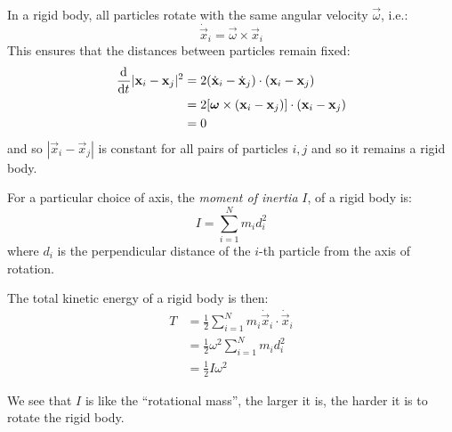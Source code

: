 \documentclass[../main.tex]{subfiles}
\begin{document}
In a rigid body, all particles rotate with the same angular velocity $\vec{\omega}$, i.e.:
\[
  \dot{\vec{x}}_i = \vec{\omega} \times \vec{x}_i
\]
This ensures that the distances between particles remain fixed:
\begin{align*}
  \deriv{}{t}|\vec{x}_i - \vec{x}_j|^2 &= 2(\dot{\vec{x}}_i - \dot{\vec{x}}_j) \cdot (\vec{x}_i - \vec{x}_j) \\
                                       &= 2 [\vec{\omega} \times (\vec{x}_i - \vec{x}_j)] \cdot (\vec{x}_i - \vec{x}_j) \\
                                       &= 0
\end{align*}
and so $|\vec{x}_i - \vec{x}_j|$ is constant for all pairs of particles $i, j$ and so it remains a rigid body.
\begin{definition}
  For a particular choice of axis, the \textit{moment of inertia} $I$, of a rigid body is:
  \[
    I = \sum_{i = 1}^{N} m_i d^2_i
  \]
  where $d_i$ is the perpendicular distance of the $i$-th particle from the axis of rotation.
\end{definition}
The total kinetic energy of a rigid body is then:
\begin{align}
  T &= \frac{1}{2} \sum_{i = 1}^{N} m_i \dot{\vec{x}}_i \cdot \dot{\vec{x}}_i \nonumber \\
    &= \frac{1}{2} \omega^2 \sum_{i = 1}^{N} m_i d^2_i \nonumber \\
    &= \frac{1}{2} I \omega^2 \label{totalRotationalKE}
\end{align}
\begin{remark}
  We see that $I$ is like the ``rotational mass'', the larger it is, the harder it is to rotate the rigid body.
\end{remark}
\end{document}

